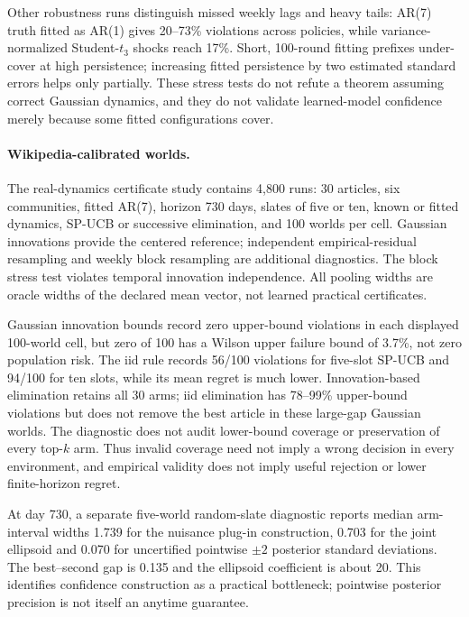 

Other robustness runs distinguish missed weekly lags and heavy tails: AR(7) truth fitted as AR(1) gives 20--73\% violations across policies, while variance-normalized Student-$t_3$ shocks reach 17\%. Short, 100-round fitting prefixes under-cover at high persistence; increasing fitted persistence by two estimated standard errors helps only partially. These stress tests do not refute a theorem assuming correct Gaussian dynamics, and they do not validate learned-model confidence merely because some fitted configurations cover.

\paragraph{Wikipedia-calibrated worlds.} The real-dynamics certificate study contains 4,800 runs: 30 articles, six communities, fitted AR(7), horizon 730 days, slates of five or ten, known or fitted dynamics, SP-UCB or successive elimination, and 100 worlds per cell. Gaussian innovations provide the centered reference; independent empirical-residual resampling and weekly block resampling are additional diagnostics. The block stress test violates temporal innovation independence. All pooling widths are oracle widths of the declared mean vector, not learned practical certificates.



Gaussian innovation bounds record zero upper-bound violations in each displayed 100-world cell, but zero of 100 has a Wilson upper failure bound of 3.7\%, not zero population risk. The iid rule records 56/100 violations for five-slot SP-UCB and 94/100 for ten slots, while its mean regret is much lower. Innovation-based elimination retains all 30 arms; iid elimination has 78--99\% upper-bound violations but does not remove the best article in these large-gap Gaussian worlds. The diagnostic does not audit lower-bound coverage or preservation of every top-$k$ arm. Thus invalid coverage need not imply a wrong decision in every environment, and empirical validity does not imply useful rejection or lower finite-horizon regret.

At day 730, a separate five-world random-slate diagnostic reports median arm-interval widths 1.739 for the nuisance plug-in construction, 0.703 for the joint ellipsoid and 0.070 for uncertified pointwise $\pm2$ posterior standard deviations. The best--second gap is 0.135 and the ellipsoid coefficient is about 20. This identifies confidence construction as a practical bottleneck; pointwise posterior precision is not itself an anytime guarantee.

